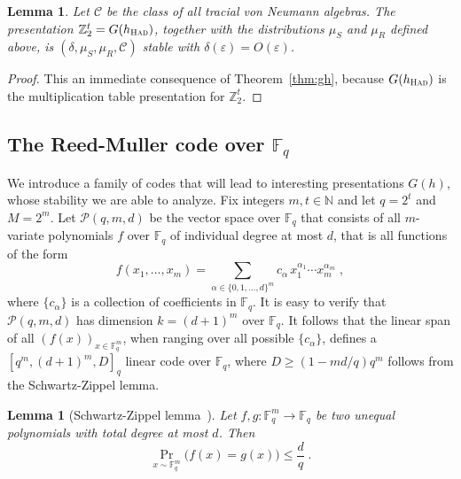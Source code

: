 \documentclass[11pt]{article}
\newtheorem{lemma}[theorem]{Lemma}
\theoremstyle{definition}
\newcommand{\N}{\ensuremath{\mathbb{N}}}
\newcommand{\F}{\ensuremath{\mathbb{F}}}
\newcommand{\Z}{\ensuremath{\mathbb{Z}}}
\newcommand{\mC}{\ensuremath{\mathcal{C}}}
\newcommand{\mP}{\ensuremath{\mathcal{P}}}
\newcommand{\had}{\textsc{Had}}
\newcommand{\eps}{\varepsilon}
\begin{document}
\begin{lemma}\label{lem:had-stab}
Let $\mC$ be the class of all tracial von Neumann algebras. 
The presentation $\Z_2^t= G(h_\had)$, together with the distributions $\mu_S$ and $\mu_R$ defined above, is $(\delta,\mu_S,\mu_R,\mC)$ stable with $\delta(\eps)=O(\eps)$. 
\end{lemma}

\begin{proof}
This an immediate consequence of Theorem~\ref{thm:gh}, because $G(h_\had)$ is the multiplication table presentation for $\Z_2^t$.
\end{proof}



\subsection{The Reed-Muller code over $\F_q$}
\label{sec:rmq}

We introduce a family of codes that will lead to interesting presentations $G(h)$, whose stability we are able to analyze.
Fix integers $m,t \in \N$ and let $q=2^t$ and $M = 2^m$. Let $\mP(q,m,d)$ be the vector space over $\F_q$ that consists of all $m$-variate polynomials $f$ over $\F_q$ of individual degree at most $d$, that is all functions of the form
\[
	f(x_1,\ldots,x_m) = \sum_{\alpha \in \{0,1,\ldots,d\}^m} c_\alpha\,
  x_1^{\alpha_1} \cdots x_m^{\alpha_m}\;,
\]
where $\{c_\alpha\}$ is a collection of coefficients in $\F_q$. It is easy to verify that $\mP(q,m,d)$ has dimension $k = (d+1)^m$ over $\F_q$. It follows that the linear span of all $(f(x))_{x\in \F_q^m}$, when ranging over all possible $\{c_\alpha\}$, defines a $[q^m,(d+1)^m,D]_q$ linear code over $\F_q$, where $D\geq (1-md/q)q^m$ follows from the Schwartz-Zippel lemma.

\begin{lemma}[Schwartz-Zippel lemma~\cite{Sch80,Zip79}]
  \label{lem:schwartz-zippel}
  Let $f, g: \F_q^m \to \F_q$ be two unequal polynomials with total degree at most $d$. Then
  \begin{equation*}
    \Pr_{x \sim \F_q^m}\big(f(x) = g(x)\big) \leq \frac{d}{q}\;.
  \end{equation*}
\end{lemma}
\end{document}
